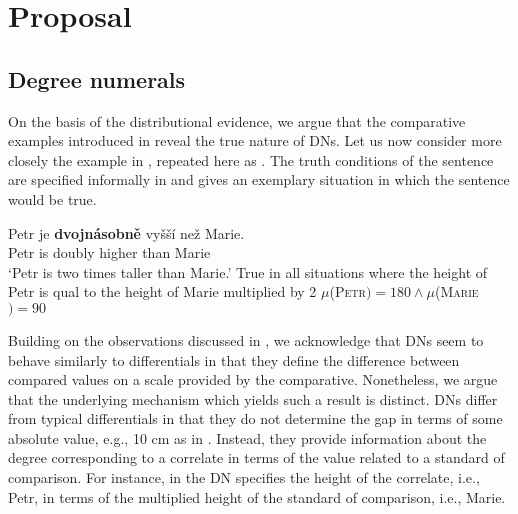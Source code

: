 \documentclass[output=paper,
modfonts,
hidelinks,
newtxmath
]{langscibook}
\begin{document}
\section{Proposal}\label{proposal}

\subsection{Degree numerals}\label{degree-numerals}

On the basis of the distributional evidence, we argue that the comparative examples introduced in  reveal the true nature of DNs. Let us now consider more closely the example in , repeated here as . The truth conditions of the sentence are specified informally in  and  gives an exemplary situation in which the sentence would be true.

\ea\label{comp-ex} \gll Petr je \textbf{dvojnásobně} vyšší než Marie.\\
Petr is doubly higher than Marie\\
\glt `Petr is two times taller than Marie.'
\ea True in all situations where the height of Petr is qual to the height of Marie multiplied by 2\label{comp-ex-int-a} 
\ex $\mu$(\textsc{Petr}$) = 180 \wedge \mu$(\textsc{Marie}$) = 90$\label{comp-ex-int-b}
\z \z

\noindent Building on the observations discussed in , we acknowledge that DNs seem to behave similarly to differentials in that they define the difference between compared values on a scale provided by the comparative. Nonetheless, we argue that the underlying mechanism which yields such a result is distinct. DNs differ from typical differentials in that they do not determine the gap in terms of some absolute value, e.g., 10 cm as in . Instead, they provide information about the degree corresponding to a correlate in terms of the value related to a standard of comparison. For instance, in  the DN specifies the height of the correlate, i.e., Petr, in terms of the multiplied height of the standard of comparison, i.e., Marie.
\end{document}
